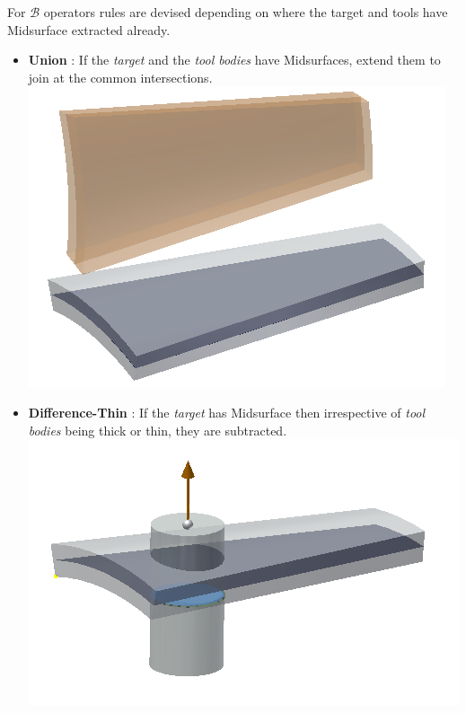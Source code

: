 For {\bf $\mathcal{B}$} operators rules are devised depending on where the target and tools have Midsurface extracted already.

\begin{itemize}[noitemsep,topsep=2pt,parsep=2pt,partopsep=2pt,label={},leftmargin=*]

\item {\bf Union} : If the {\em target} and the {\em tool bodies} have Midsurfaces, extend them to join at the common intersections.
\includegraphics[scale=0.45]{../Common/images//Midsurf_unite.png} 

\item {\bf Difference-Thin} : If the {\em target} has Midsurface then irrespective of {\em tool bodies} being thick or thin, they are subtracted. 
\includegraphics[scale=0.45]{../Common/images//Midsurf_diffthin.png}


\end{itemize}
